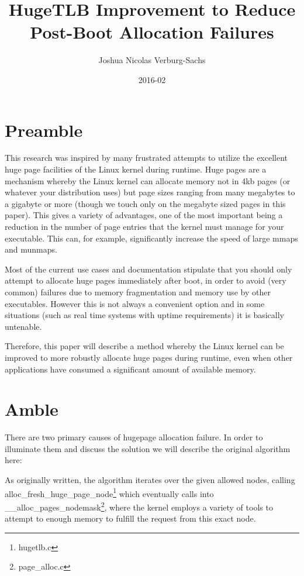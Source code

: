 \documentclass{article}
\title{HugeTLB Improvement to Reduce Post-Boot Allocation Failures}
\date{2016-02}
\author{Joshua Nicolas Verburg-Sachs}
\begin{document}
	\maketitle
	\newpage
	\tableofcontents
	\newpage

	\section{Preamble}
		This research was inspired by many frustrated attempts to utilize the excellent huge page facilities of the Linux kernel during runtime. Huge pages are a mechanism whereby the Linux kernel can allocate memory not in 4kb pages (or whatever your distribution uses) but page sizes ranging from many megabytes to a gigabyte or more (though we touch only on the megabyte sized pages in this paper). This gives a variety of advantages, one of the most important being a reduction in the number of page entries that the kernel must manage for your executable. This can, for example, significantly increase the speed of large mmaps and munmaps.

Most of the current use cases and documentation stipulate that you should only attempt to allocate huge pages immediately after boot, in order to avoid (very common) failures due to memory fragmentation and memory use by other executables. However this is not always a convenient option and in some situations (such as real time systems with uptime requirements) it is basically untenable.

Therefore, this paper will describe a method whereby the Linux kernel can be improved to more robustly allocate huge pages during runtime, even when other applications have consumed a significant amount of available memory.

\newpage
\section{Amble}
	There are two primary causes of hugepage allocation failure. In order to illuminate them and discuss the solution we will describe the original algorithm here:
\begin{figure}[h]

\label{figure:Original alloc_fresh_huge_page}
\end{figure}

As originally written, the algorithm iterates over the given allowed nodes, calling alloc\_fresh\_huge\_page\_node\footnote{hugetlb.c} which eventually calls into \_\_alloc\_pages\_nodemask\footnote{page\_alloc.c}, where the kernel employs a variety of tools to attempt to enough memory to fulfill the request from this exact node. 
\end{document}
